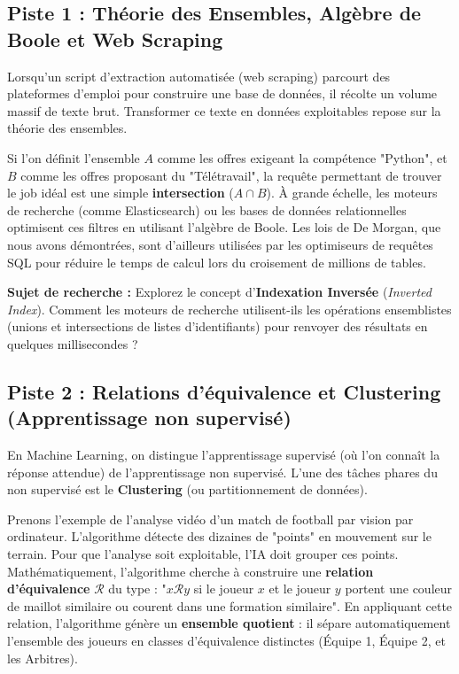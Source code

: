 \subsection*{Piste 1 : Théorie des Ensembles, Algèbre de Boole et Web Scraping}
Lorsqu'un script d'extraction automatisée (web scraping) parcourt des plateformes d'emploi pour construire une base de données, il récolte un volume massif de texte brut. Transformer ce texte en données exploitables repose sur la théorie des ensembles. 

Si l'on définit l'ensemble $A$ comme les offres exigeant la compétence "Python", et $B$ comme les offres proposant du "Télétravail", la requête permettant de trouver le job idéal est une simple \textbf{intersection} ($A \cap B$). À grande échelle, les moteurs de recherche (comme Elasticsearch) ou les bases de données relationnelles optimisent ces filtres en utilisant l'algèbre de Boole. Les lois de De Morgan, que nous avons démontrées, sont d'ailleurs utilisées par les optimiseurs de requêtes SQL pour réduire le temps de calcul lors du croisement de millions de tables.

\textbf{Sujet de recherche :} Explorez le concept d'\textbf{Indexation Inversée} (\textit{Inverted Index}). Comment les moteurs de recherche utilisent-ils les opérations ensemblistes (unions et intersections de listes d'identifiants) pour renvoyer des résultats en quelques millisecondes ?

\subsection*{Piste 2 : Relations d'équivalence et Clustering (Apprentissage non supervisé)}
En Machine Learning, on distingue l'apprentissage supervisé (où l'on connaît la réponse attendue) de l'apprentissage non supervisé. L'une des tâches phares du non supervisé est le \textbf{Clustering} (ou partitionnement de données).

Prenons l'exemple de l'analyse vidéo d'un match de football par vision par ordinateur. L'algorithme détecte des dizaines de "points" en mouvement sur le terrain. Pour que l'analyse soit exploitable, l'IA doit grouper ces points. Mathématiquement, l'algorithme cherche à construire une \textbf{relation d'équivalence} $\mathcal{R}$ du type : "$x \mathcal{R} y$ si le joueur $x$ et le joueur $y$ portent une couleur de maillot similaire ou courent dans une formation similaire". 
En appliquant cette relation, l'algorithme génère un \textbf{ensemble quotient} : il sépare automatiquement l'ensemble des joueurs en classes d'équivalence distinctes (Équipe 1, Équipe 2, et les Arbitres).



